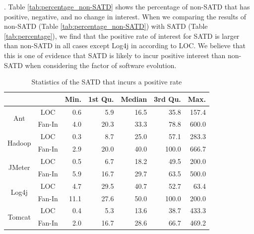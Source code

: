 \documentclass[10pt, conference]{IEEEtran}
\newcommand{\smallsection}[1]{\vspace{1mm}\noindent {\bf #1}.\hspace{2mm}}
\begin{document}
\smallsection{Result}
Table \ref{tab:percentage_non-SATD} shows the percentage of non-SATD that has positive, negative, and no change in interest. When we comparing the results of non-SATD (Table \ref{tab:percentage_non-SATD}) with SATD (Table \ref{tab:percentage}), we find that the positive rate of interest for SATD is larger than non-SATD in all cases except Log4j in according to LOC. We believe that this is one of evidence that SATD is likely to incur positive interest than non-SATD when considering the factor of software evolution.

\begin{table}[tb]
  \caption{Statistics of the SATD that incurs a positive rate}
  \label{tab:statistic}
  \centering

  \begin{tabular}{cc|rrrrr}
  \hline
      &  & \textbf{Min.} & \textbf{1st Qu.} & \textbf{Median} & \textbf{3rd Qu.} & \textbf{Max.} \\
  \hline
\multirow{2}{*}{Ant} &    LOC  & 0.6 &  5.9  &  16.5  &  35.8  &  157.4 \\
                     & Fan-In  & 4.0 & 20.3  &  33.3  &  78.8  &  600.0 \\
  \hline
\multirow{2}{*}{Hadoop} & LOC  & 0.3 &  8.7  &  25.0  &   57.1 &  283.3 \\
                     & Fan-In  & 2.9 & 20.0  &  40.0  &  100.0 &  666.7 \\
  \hline
\multirow{2}{*}{JMeter} & LOC  & 0.5 &  6.7  &  18.2  &   49.5 &  200.0 \\
                     & Fan-In  & 5.9 & 16.7  &  29.7  &   63.5 &  500.0 \\
  \hline
\multirow{2}{*}{Log4j} &  LOC  &  4.7 &  29.5 &  40.7  &   52.7 &   63.4 \\
                     & Fan-In  & 11.1 &  27.6 &  50.0  &  100.0 &  200.0 \\
  \hline
\multirow{2}{*}{Tomcat} & LOC  & 0.4 &  5.3  &  13.6  &   38.7 &  433.3 \\
                     & Fan-In  & 2.0 & 16.7  &  28.6  &   66.7 &  469.2 \\
  \hline
  \end{tabular}
\end{table}
\end{document}

